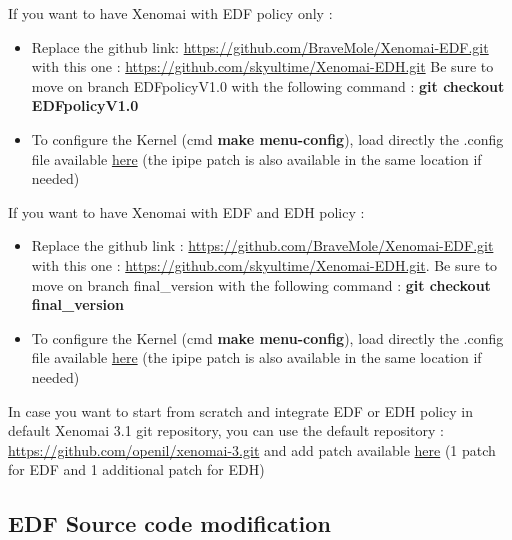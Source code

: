\documentclass[12pt,hidelinks]{article}
\begin{document}
{    If you want to have Xenomai with EDF policy only :
    \begin{itemize}
       \item Replace the github link: \href{https://github.com/BraveMole/Xenomai-EDF.git}{https://github.com/BraveMole/Xenomai-EDF.git} with this one : \href{https://github.com/skyultime/Xenomai-EDH.git}{https://github.com/skyultime/Xenomai-EDH.git} Be sure to move on branch EDFpolicyV1.0 with the following command : \textbf{git checkout EDFpolicyV1.0}
       
       \item To configure the Kernel (cmd \textbf{make menu-config}), load directly the .config file available \href{https://github.com/skyultime/M2_ERTS_Project_xenomai_edh/tree/dev/SourceCode/Patch/linuxConfigFiles}{here} (the ipipe patch is also available in the same location if needed)
       
    \end{itemize}
    
    If you want to have Xenomai with EDF and EDH policy :
     \begin{itemize}
       \item Replace the github link : \href{https://github.com/BraveMole/Xenomai-EDF.git}{https://github.com/BraveMole/Xenomai-EDF.git} with this one : \href{https://github.com/skyultime/Xenomai-EDH.git}{https://github.com/skyultime/Xenomai-EDH.git}. Be sure to move on branch final\_version with the following command : \textbf{git checkout final\_version}
       
       \item To configure the Kernel (cmd \textbf{make menu-config}), load directly the .config file available \href{https://github.com/skyultime/M2_ERTS_Project_xenomai_edh/tree/dev/SourceCode/Patch/linuxConfigFiles}{here} (the ipipe patch is also available in the same location if needed)
       
    \end{itemize}
    
    In case you want to start from scratch and integrate EDF or EDH policy in default Xenomai 3.1 git repository, you can use the default repository : \href{https://github.com/openil/xenomai-3.git}{https://github.com/openil/xenomai-3.git} and add patch available \href{https://github.com/skyultime/M2_ERTS_Project_xenomai_edh/tree/dev/SourceCode/Patch}{here} (1 patch for EDF and 1 additional patch for EDH)

    \subsection{EDF Source code modification}
        
}
\end{document}
